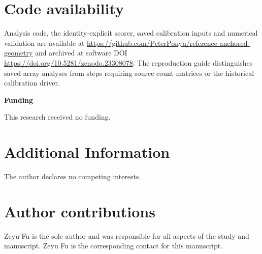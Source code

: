 \documentclass[11pt]{article}
\begin{document}
\section*{Code availability}
Analysis code, the identity-explicit scorer, saved calibration inputs and numerical validation are available at \url{https://github.com/PeterPonyu/reference-anchored-geometry} and archived at software DOI \url{https://doi.org/10.5281/zenodo.23308078}. The reproduction guide distinguishes saved-array analyses from steps requiring source count matrices or the historical calibration driver.

\noindent\textbf{Funding}\par\nobreak

This research received no funding.



\section*{Additional Information}
The author declares no competing interests.

{\footnotesize\raggedright\setlength{\bibsep}{1pt}\setlength{\emergencystretch}{3em}

}

\section*{Author contributions}
Zeyu Fu is the sole author and was responsible for all aspects of the study and manuscript. Zeyu Fu is the corresponding contact for this manuscript.

\clearpage
\end{document}
